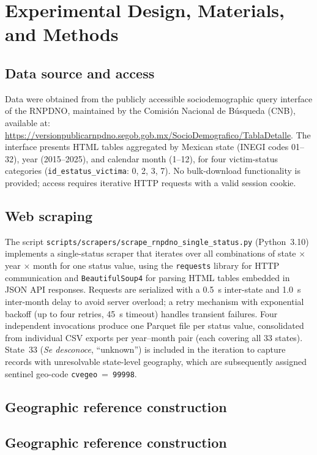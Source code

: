 \documentclass[3p]{elsarticle}
\begin{document}
\section*{Experimental Design, Materials, and Methods}

\subsection*{Data source and access}

Data were obtained from the publicly accessible sociodemographic
query interface of the RNPDNO, maintained by the Comisión Nacional
de Búsqueda (CNB), available at:
\url{https://versionpublicarnpdno.segob.gob.mx/SocioDemografico/TablaDetalle}.
The interface presents HTML tables aggregated by Mexican state
(INEGI codes 01--32), year (2015--2025), and calendar month (1--12),
for four victim-status categories
(\texttt{id\_estatus\_victima}: 0, 2, 3, 7).
No bulk-download functionality is provided; access requires
iterative HTTP requests with a valid session cookie.

\subsection*{Web scraping}

The script \texttt{scripts/scrapers/scrape\_rnpdno\_single\_status.py} (Python~3.10)
implements a single-status scraper that iterates over all
combinations of state $\times$ year $\times$ month for one
status value, using the \texttt{requests} library for HTTP
communication and \texttt{BeautifulSoup4} for parsing HTML tables
embedded in JSON API responses.
Requests are serialized with a 0.5~s inter-state and 1.0~s
inter-month delay to avoid server overload; a retry mechanism
with exponential backoff (up to four retries, 45~s timeout)
handles transient failures. Four independent invocations produce one Parquet file per status value, consolidated from individual CSV exports per
  year--month pair (each covering all 33 states).  
State~33 (\emph{Se desconoce}, ``unknown'') is included in the iteration
to capture records with unresolvable state-level geography,
which are subsequently assigned sentinel geo-code
\texttt{cvegeo}~=~\texttt{99998}.

\subsection*{Geographic reference construction}

\subsection*{Geographic reference construction}
\end{document}
